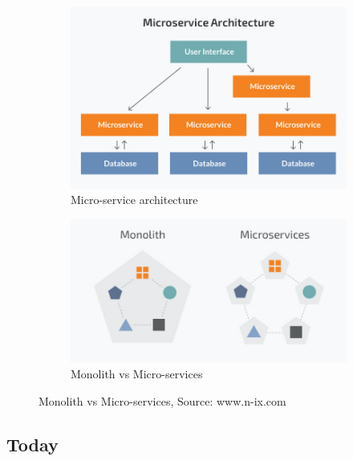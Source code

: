 \begin{figure}[H]
    \centering
    \begin{subfigure}[a]{0.45\textwidth}
        \includegraphics[width=\textwidth]{figures/micro.jpg}
        \caption{Micro-service architecture}
        \label{fig:micro}
    \end{subfigure}
    \hfill
    \begin{subfigure}[b]{0.54\textwidth}
        \includegraphics[width=\textwidth]{figures/micro vs mono.jpg}
        \caption{Monolith vs Micro-services}
        \label{fig:mono-vs-micro}
    \end{subfigure}
    \caption{\label{fig:mono-micro}Monolith vs Micro-services, Source: www.n-ix.com~\cite{monoVsMicro}}
\end{figure}

\subsection{Today}

